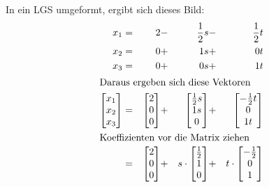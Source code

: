 \documentclass[10pt,a4paper,oneside,ngerman,numbers=noenddot]{scrartcl}
\begin{document}
\subsection{} %
In ein LGS umgeformt, ergibt sich dieses Bild:\\
\begin{alignat*}{4}
x_{1} &=& 2 &-& \frac{1}{2}s &-& \frac{1}{2}t \\
x_{2} &=& 0 &+& 1s &+& 0t \\
x_{3} &=& 0 &+& 0s &+& 1t \\
\intertext{Daraus ergeben sich diese Vektoren}
\begin{bmatrix}
x_{1} \\
x_{2} \\
x_{3}
\end{bmatrix} &=& 
\begin{bmatrix}
2 \\
0 \\
0
\end{bmatrix} &+&
\begin{bmatrix}
\frac{1}{2}s \\
1s \\
0
\end{bmatrix} &+&
\begin{bmatrix}
-\frac{1}{2}t \\
0 \\
1t
\end{bmatrix} \\
\intertext{Koeffizienten vor die Matrix ziehen}
&=& \begin{bmatrix}
2 \\
0 \\
0
\end{bmatrix} &+& s \cdot
\begin{bmatrix}
\frac{1}{2} \\
1 \\
0
\end{bmatrix} &+& t \cdot 
\begin{bmatrix}
-\frac{1}{2} \\
0 \\
1
\end{bmatrix}
\end{alignat*}
\end{document}
